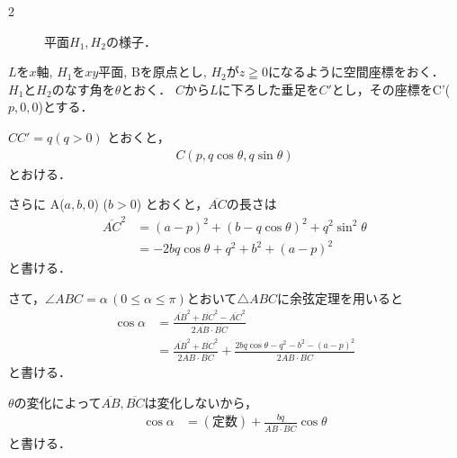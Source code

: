 \documentclass[../../../../main.tex]{subfiles}
\begin{document}
\begin{multicols}{2}
\begin{figure}[H]
    \caption{平面$H_1,H_2$の様子．}
    \label{1992-2:fig:1}
  \end{figure}

  $L$を$x$軸, $H_1$を$xy$平面, Bを原点とし,
  $H_2$が$z \geqq 0$になるように空間座標をおく．
  $H_1$と$H_2$のなす角を$\theta$とおく．
  $C$から$L$に下ろした垂足を$C'$とし，その座標をC'($p, 0, 0$)とする．

  $CC' = q (q>0)$ とおくと，
  \begin{align*}
    C(p, q\cos\theta, q\sin\theta)
  \end{align*}
  とおける．

  さらに A($a, b, 0$) ($b>0$) とおくと，$\overline{AC}$の長さは
  \begin{align*}
    \overline{AC}^2
     & = (a-p)^2 + (b-q\cos\theta)^2 + q^2\sin^2\theta \\
     & = -2bq\cos\theta + q^2+b^2+(a-p)^2
  \end{align*}
  と書ける．

  さて，$\angle ABC=\alpha\, (0 \le \alpha \le \pi)$とおいて$\triangle ABC$に余弦定理を用いると
  \begin{align*}
    \cos\alpha
     & = \frac{\overline{AB}^2+\overline{BC}^2-\overline{AC}^2}{2\overline{AB} \cdot \overline{BC}}                                                              \\
     & = \frac{\overline{AB}^2+\overline{BC}^2}{2\overline{AB} \cdot \overline{BC}} + \frac{2bq\cos\theta - q^2-b^2-(a-p)^2}{2\overline{AB} \cdot \overline{BC}}
  \end{align*}
  と書ける．

  $\theta$の変化によって$\overline{AB}, \overline{BC}$は変化しないから，
  \begin{align*}
    \cos\alpha
     & = (\text{定数})  + \frac{bq}{\overline{AB} \cdot \overline{BC}} \cos\theta
  \end{align*}
  と書ける．


\end{multicols}
\end{document}
